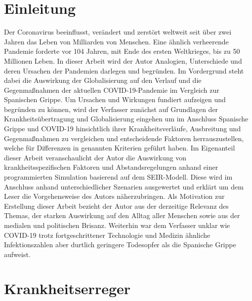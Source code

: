 \documentclass[12pt]{article}
\begin{document}
\section{Einleitung}
Der Coronavirus beeinflusst, verändert und zerstört weltweit seit über zwei Jahren das Leben von Milliarden von Menschen. Eine ähnlich verheerende Pandemie forderte vor 104 Jahren, mit Ende des ersten Weltkrieges, bis zu 50 Millionen Leben. In dieser Arbeit wird der Autor Analogien, Unterschiede und deren Ursachen der Pandemien darlegen und begründen. Im Vordergrund steht dabei die Auswirkung der Globalisierung auf den Verlauf und die Gegenmaßnahmen der aktuellen COVID-19-Pandemie im Vergleich zur Spanischen Grippe. Um Ursachen und Wirkungen fundiert aufzeigen und begründen zu können, wird der Verfasser zunächst auf Grundlagen der Krankheitsübertragung und Globalisierung eingehen um im Anschluss Spanische Grippe und COVID-19 hinsichtlich ihrer Krankheitsverläufe, Ausbreitung und Gegenmaßnahmen zu vergleichen und entscheidende Faktoren herrauszustellen, welche für Differenzen in genannten Kriterien geführt haben. Im Eigenanteil dieser Arbeit veranschaulicht der Autor die Auswirkung von krankheitsspezifischen Faktoren und Abstandsregelungen anhand einer programmierten Simulation basierend auf dem SEIR-Modell. Diese wird im Anschluss anhand unterschiedlicher Szenarien ausgewertet und erklärt um dem Leser die Vorgehensweise des Autors näherzubringen. Als Motivation zur Erstellung dieser Arbeit bezieht der Autor aus der derzeitige Relevanz des Themas, der starken Auswirkung auf den Alltag aller Menschen sowie aus der medialen und politischen Brisanz. Weiterhin war dem Verfasser unklar wie COVID-19 trotz fortgeschrittener Technologie und Medizin ähnliche Infektionszahlen aber durtlich geringere Todesopfer als die Spanische Grippe aufweist.

\newpage
\section{Krankheitserreger}\label{sec:Krankheitserreger}
\end{document}
